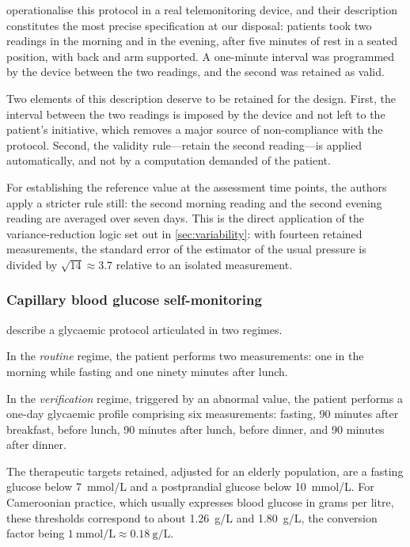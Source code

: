 \documentclass[12pt,a4paper,oneside]{report}
\begin{document}
\textcite{mihevc2025} operationalise this protocol in a real telemonitoring device, and their description constitutes the most precise specification at our disposal: patients took two readings in the morning and in the evening, after five minutes of rest in a seated position, with back and arm supported. A one-minute interval was programmed by the device between the two readings, and the second was retained as valid.

Two elements of this description deserve to be retained for the design. First, the interval between the two readings is imposed by the device and not left to the patient's initiative, which removes a major source of non-compliance with the protocol. Second, the validity rule---retain the second reading---is applied automatically, and not by a computation demanded of the patient.

For establishing the reference value at the assessment time points, the authors apply a stricter rule still: the second morning reading and the second evening reading are averaged over seven days. This is the direct application of the variance-reduction logic set out in \cref{sec:variability}: with fourteen retained measurements, the standard error of the estimator of the usual pressure is divided by $\sqrt{14} \approx 3.7$ relative to an isolated measurement.

\subsubsection{Capillary blood glucose self-monitoring}

\textcite{mihevc2025} describe a glycaemic protocol articulated in two regimes.

In the \emph{routine} regime, the patient performs two measurements: one in the morning while fasting and one ninety minutes after lunch.

In the \emph{verification} regime, triggered by an abnormal value, the patient performs a one-day glycaemic profile comprising six measurements: fasting, 90 minutes after breakfast, before lunch, 90 minutes after lunch, before dinner, and 90 minutes after dinner.

The therapeutic targets retained, adjusted for an elderly population, are a fasting glucose below 7~mmol/L and a postprandial glucose below 10~mmol/L. For Cameroonian practice, which usually expresses blood glucose in grams per litre, these thresholds correspond to about 1.26~g/L and 1.80~g/L, the conversion factor being $1\ \text{mmol/L} \approx 0.18\ \text{g/L}$.
\end{document}
